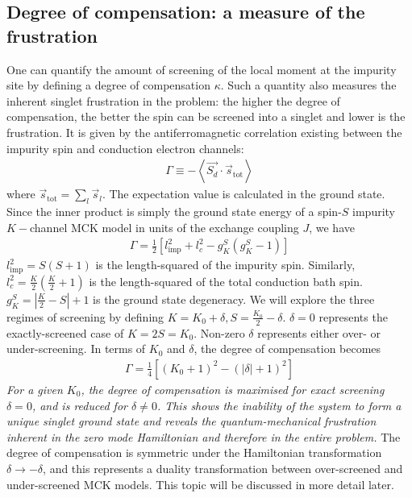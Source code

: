 \documentclass[12pt]{revtex4-2}
\begin{document}
\subsection{Degree of compensation: a measure of the frustration}
One can quantify the amount of screening of the local moment at the impurity site by defining a degree of compensation \(\kappa\). Such a quantity also measures the inherent singlet frustration in the problem: the higher the degree of compensation, the better the spin can be screened into a singlet and lower is the frustration. It is given by the antiferromagnetic correlation existing between the impurity spin and conduction electron channels:
\begin{equation}\begin{aligned}
	\Gamma \equiv - \left< \vec{S_d}\cdot \vec{s}_\text{tot}\right>
\end{aligned}\end{equation}
where \(\vec s_\text{tot} = \sum_l \vec s_l\). The expectation value is calculated in the ground state. Since the inner product is simply the ground state energy of a spin-\(S\) impurity \(K-\)channel MCK model in units of the exchange coupling \(J\), we have
\begin{equation}\begin{aligned}
	\Gamma = \frac{1}{2} \left[ l_\text{imp}^2 + l_c^2 - g^S_K\left( g^S_K - 1 \right)\right]
\end{aligned}\end{equation}
\(l_\text{imp}^2 = S(S+1)\) is the length-squared of the impurity spin. Similarly, \(l_c^2 = \frac{K}{2}\left(\frac{K}{2} + 1\right) \) is the length-squared of the total conduction bath spin. \(g^S_K = |\frac{K}{2} - S| + 1\) is the ground state degeneracy. We will explore the three regimes of screening by defining \(K = K_0 + \delta, S = \frac{K_0}{2} - \delta\). \(\delta=0\) represents the exactly-screened case of \(K = 2S = K_0\). Non-zero \(\delta\) represents either over- or under-screening. In terms of \(K_0\) and \(\delta\), the degree of compensation becomes
\begin{equation}\begin{aligned}
	\label{gamma}
	\Gamma = \frac{1}{4}\left[\left( K_0 + 1 \right) ^2 - \left(|\delta| + 1 \right) ^2\right] 
\end{aligned}\end{equation}
\textit{For a given \(K_0\), the degree of compensation is maximised for exact screening \(\delta=0\), and is reduced for \(\delta \neq 0\). This shows the inability of the system to form a unique singlet ground state and reveals the quantum-mechanical frustration inherent in the zero mode Hamiltonian and therefore in the entire problem.} The degree of compensation is symmetric under the Hamiltonian transformation \(\delta \to -\delta\), and this represents a duality transformation between over-screened and under-screened MCK models. This topic will be discussed in more detail later.
\end{document}
